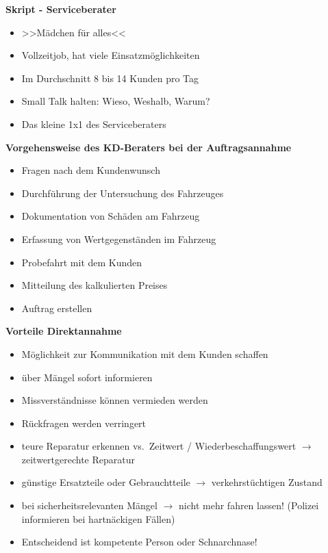 \textbf{Skript - Serviceberater}

\begin{itemize}
\item
  >>Mädchen für alles<<
\item
  Vollzeitjob, hat viele Einsatzmöglichkeiten
\item
  Im Durchschnitt 8 bis 14 Kunden pro Tag
\item
  Small Talk halten: Wieso, Weshalb, Warum?
\item
  Das kleine 1x1 des Serviceberaters
\end{itemize}

\textbf{Vorgehensweise des KD-Beraters bei der Auftragsannahme}

\begin{itemize}
\item
  Fragen nach dem Kundenwunsch
\item
  Durchführung der Untersuchung des Fahrzeuges
\item
  Dokumentation von Schäden am Fahrzeug
\item
  Erfassung von Wertgegenständen im Fahrzeug
\item
  Probefahrt mit dem Kunden
\item
  Mitteilung des kalkulierten Preises
\item
  Auftrag erstellen
\end{itemize}

\textbf{Vorteile Direktannahme}

\begin{itemize}
\item
  Möglichkeit zur Kommunikation mit dem Kunden schaffen
\item
  über Mängel sofort informieren
\item
  Missverständnisse können vermieden werden
\item
  Rückfragen werden verringert
\item
  teure Reparatur erkennen vs.~Zeitwert / Wiederbeschaffungswert $\to$
  zeitwertgerechte Reparatur
\item
  günstige Ersatzteile oder Gebrauchtteile $\to$ verkehrstüchtigen
  Zustand
\item
  bei sicherheitsrelevanten Mängel $\to$ nicht mehr fahren lassen!
  (Polizei informieren bei hartnäckigen Fällen)
\item
  Entscheidend ist kompetente Person oder Schnarchnase!
\end{itemize}
